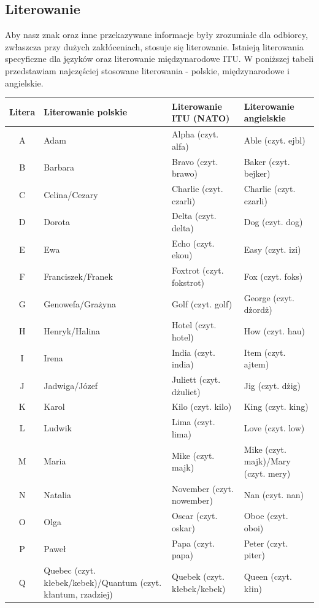 \documentclass[a4paper,11pt]{article}
\begin{document}
\subsection{Literowanie}
Aby nasz znak oraz inne przekazywane informacje były zrozumiałe dla odbiorcy, zwłaszcza przy dużych zakłóceniach, stosuje się literowanie. Istnieją literowania specyficzne dla języków oraz literowanie międzynarodowe ITU. W poniższej tabeli przedstawiam najczęściej stosowane literowania - polskie, międzynarodowe i angielskie.
\begin{center}
\begin{tabular}{| c | p{4cm} | p{4cm} | p{4cm} |}
\hline
\textbf{Litera} & \textbf{Literowanie polskie} & \textbf{Literowanie ITU (NATO)} & \textbf{Literowanie angielskie} \\ \hline
A & Adam & Alpha (czyt. alfa) & Able (czyt. ejbl) \\ \hline
B & Barbara & Bravo (czyt. brawo) & Baker (czyt. bejker) \\ \hline
C & Celina/Cezary & Charlie (czyt. czarli) & Charlie (czyt. czarli) \\ \hline
D & Dorota & Delta (czyt. delta) & Dog (czyt. dog) \\ \hline
E & Ewa & Echo (czyt. ekou) & Easy (czyt. izi) \\ \hline
F & Franciszek/Franek & Foxtrot (czyt. fokstrot) & Fox (czyt. foks) \\ \hline
G & Genowefa/Grażyna & Golf (czyt. golf) & George (czyt. dżordż) \\ \hline
H & Henryk/Halina & Hotel (czyt. hotel) & How (czyt. hau) \\ \hline
I & Irena & India (czyt. india) & Item (czyt. ajtem) \\ \hline
J & Jadwiga/Józef & Juliett (czyt. dżuliet) & Jig (czyt. dżig) \\ \hline
K & Karol & Kilo (czyt. kilo) & King (czyt. king) \\ \hline
L & Ludwik & Lima (czyt. lima) & Love (czyt. low) \\ \hline
M & Maria & Mike (czyt. majk) & Mike (czyt. majk)/Mary (czyt. mery) \\ \hline
N & Natalia & November (czyt. nowember) & Nan (czyt. nan) \\ \hline
O & Olga & Oscar (czyt. oskar) & Oboe (czyt. oboi) \\ \hline
P & Paweł & Papa (czyt. papa) & Peter (czyt. piter) \\ \hline
Q & Quebec (czyt. kłebek/kebek)/Quantum (czyt. kłantum, rzadziej) & Quebek (czyt. kłebek/kebek) & Queen (czyt. kłin) \\ \hline

\end{tabular}
\end{center}
\end{document}
